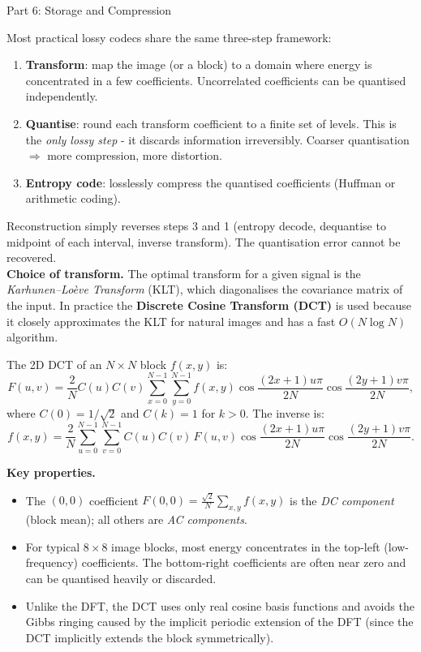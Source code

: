 \documentclass[letterpaper]{article}
\begin{document}
\begin{notes}{Part 6: Storage and Compression}

Most practical lossy codecs share the same three-step framework:
\begin{enumerate}
    \item \textbf{Transform}: map the image (or a block) to a domain where energy is concentrated in a few coefficients. Uncorrelated coefficients can be quantised independently.
    \item \textbf{Quantise}: round each transform coefficient to a finite set of levels. This is the \emph{only lossy step} - it discards information irreversibly. Coarser quantisation $\Rightarrow$ more compression, more distortion.
    \item \textbf{Entropy code}: losslessly compress the quantised coefficients (Huffman or arithmetic coding).
\end{enumerate}
Reconstruction simply reverses steps 3 and 1 (entropy decode, dequantise to midpoint of each interval, inverse transform). The quantisation error cannot be recovered.\\

\textbf{Choice of transform.} The optimal transform for a given signal is the \emph{Karhunen--Loève Transform} (KLT), which diagonalises the covariance matrix of the input. In practice the \textbf{Discrete Cosine Transform (DCT)} is used because it closely approximates the KLT for natural images and has a fast $O(N\log N)$ algorithm.


The 2D DCT of an $N\times N$ block $f(x,y)$ is:
$$F(u,v) = \frac{2}{N}C(u)C(v)\sum_{x=0}^{N-1}\sum_{y=0}^{N-1} f(x,y)\cos\!\frac{(2x+1)u\pi}{2N}\cos\!\frac{(2y+1)v\pi}{2N},$$
where $C(0)=1/\sqrt{2}$ and $C(k)=1$ for $k>0$. The inverse is:
$$f(x,y) = \frac{2}{N}\sum_{u=0}^{N-1}\sum_{v=0}^{N-1} C(u)C(v)\,F(u,v)\cos\!\frac{(2x+1)u\pi}{2N}\cos\!\frac{(2y+1)v\pi}{2N}.$$

\textbf{Key properties.}
\begin{itemize}
    \item The $(0,0)$ coefficient $F(0,0) = \frac{\sqrt{2}}{N}\sum_{x,y} f(x,y)$ is the \emph{DC component} (block mean); all others are \emph{AC components}.
    \item For typical $8\times8$ image blocks, most energy concentrates in the top-left (low-frequency) coefficients. The bottom-right coefficients are often near zero and can be quantised heavily or discarded.
    \item Unlike the DFT, the DCT uses only real cosine basis functions and avoids the Gibbs ringing caused by the implicit periodic extension of the DFT (since the DCT implicitly extends the block symmetrically).
\end{itemize}


\end{notes}
\end{document}
